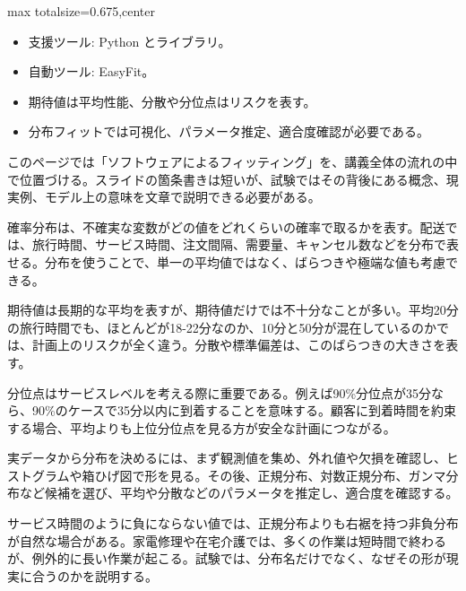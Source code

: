 \clearpage
{}
\begin{adjustbox}{max totalsize={\textwidth}{0.675\textheight},center}
\begin{minipage}{\textwidth}\scriptsize
\begin{minipage}[t]{0.485\textwidth}
\begin{itemize}
\item 支援ツール: Python とライブラリ。
\item 自動ツール: EasyFit。
\end{itemize}
\begin{itemize}
\item 期待値は平均性能、分散や分位点はリスクを表す。
\item 分布フィットでは可視化、パラメータ推定、適合度確認が必要である。
\end{itemize}
\end{minipage}\hfill
\begin{minipage}[t]{0.485\textwidth}
このページでは「ソフトウェアによるフィッティング」を、講義全体の流れの中で位置づける。スライドの箇条書きは短いが、試験ではその背後にある概念、現実例、モデル上の意味を文章で説明できる必要がある。\par
確率分布は、不確実な変数がどの値をどれくらいの確率で取るかを表す。配送では、旅行時間、サービス時間、注文間隔、需要量、キャンセル数などを分布で表せる。分布を使うことで、単一の平均値ではなく、ばらつきや極端な値も考慮できる。\par
期待値は長期的な平均を表すが、期待値だけでは不十分なことが多い。平均20分の旅行時間でも、ほとんどが18-22分なのか、10分と50分が混在しているのかでは、計画上のリスクが全く違う。分散や標準偏差は、このばらつきの大きさを表す。\par
分位点はサービスレベルを考える際に重要である。例えば90\%分位点が35分なら、90\%のケースで35分以内に到着することを意味する。顧客に到着時間を約束する場合、平均よりも上位分位点を見る方が安全な計画につながる。\par
実データから分布を決めるには、まず観測値を集め、外れ値や欠損を確認し、ヒストグラムや箱ひげ図で形を見る。その後、正規分布、対数正規分布、ガンマ分布など候補を選び、平均や分散などのパラメータを推定し、適合度を確認する。\par
サービス時間のように負にならない値では、正規分布よりも右裾を持つ非負分布が自然な場合がある。家電修理や在宅介護では、多くの作業は短時間で終わるが、例外的に長い作業が起こる。試験では、分布名だけでなく、なぜその形が現実に合うのかを説明する。\par

\end{minipage}
\end{minipage}
\end{adjustbox}
